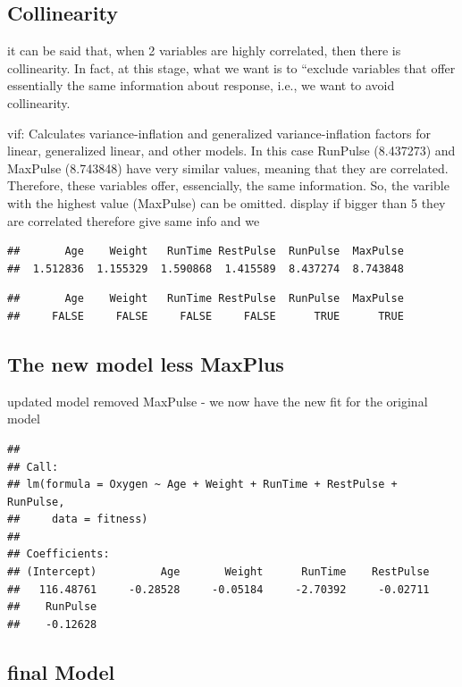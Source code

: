 \documentclass[]{article}
\begin{document}
\subsection{Collinearity}\label{collinearity}

it can be said that, when 2 variables are highly correlated, then there
is collinearity. In fact, at this stage, what we want is to ``exclude
variables that offer essentially the same information about response,
i.e., we want to avoid collinearity.

vif: Calculates variance-inflation and generalized variance-inflation
factors for linear, generalized linear, and other models. In this case
RunPulse (8.437273) and MaxPulse (8.743848) have very similar values,
meaning that they are correlated. Therefore, these variables offer,
essencially, the same information. So, the varible with the highest
value (MaxPulse) can be omitted. display if bigger than 5 they are
correlated therefore give same info and we

\begin{verbatim}
##       Age    Weight   RunTime RestPulse  RunPulse  MaxPulse 
##  1.512836  1.155329  1.590868  1.415589  8.437274  8.743848
\end{verbatim}

\begin{verbatim}
##       Age    Weight   RunTime RestPulse  RunPulse  MaxPulse 
##     FALSE     FALSE     FALSE     FALSE      TRUE      TRUE
\end{verbatim}

\subsection{The new model less
MaxPlus}\label{the-new-model-less-maxplus}

updated model removed MaxPulse - we now have the new fit for the
original model

\begin{verbatim}
## 
## Call:
## lm(formula = Oxygen ~ Age + Weight + RunTime + RestPulse + RunPulse, 
##     data = fitness)
## 
## Coefficients:
## (Intercept)          Age       Weight      RunTime    RestPulse  
##   116.48761     -0.28528     -0.05184     -2.70392     -0.02711  
##    RunPulse  
##    -0.12628
\end{verbatim}

\subsection{final Model}\label{final-model}
\end{document}
